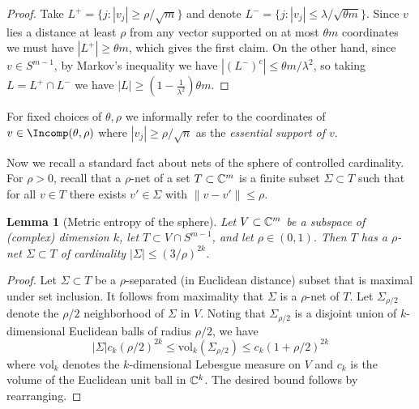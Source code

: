 \documentclass[aop,preprint]{imsart}
\theoremstyle{plain}
\newtheorem{lemma}[theorem]{Lemma}
\theoremstyle{definition}
\theoremstyle{remark}
\numberwithin{equation}{section}
\numberwithin{theorem}{section}
\begin{document}
\begin{proof}
Take $L^+=\{j:|v_j|\ge \rho/\sqrt{m}\}$ and denote $L^-= \{j:|v_j|\le \lambda/\sqrt{\theta m}\}$.
Since $v$ lies a distance at least $\rho$ from any vector supported on at most $\theta m$ coordinates we must have $|L^+|\ge \theta m$, which gives the first claim. 
On the other hand, since $v\in S^{m-1}$, by Markov's inequality we have 
$|(L^-)^c|\le \theta m/\lambda^2$, 
%
so taking $L=L^+\cap L^-$ we have $|L|\ge (1-\frac1{\lambda^2})\theta m$.
\end{proof}

For fixed choices of $\theta,\rho$ we informally refer to the coordinates of $v\in \Incomp(\theta,\rho)$ where $|v_j|\ge \rho/\sqrt{n}$ as the \emph{essential support of $v$}. 

Now we recall a standard fact about nets of the sphere of controlled cardinality.
For $\rho>0$, recall that a $\rho$-net of a set $T\subset {\mathbb C}^m$ is a finite subset $\Sigma\subset T$ such that for all $v\in T$ there exists $v'\in \Sigma$ with $\|v-v'\|\le \rho$.

\begin{lemma}[Metric entropy of the sphere]	\label{lem:net}
Let $V\subset {\mathbb C}^m$ be a subspace of (complex) dimension $k$, let $T\subset V\cap S^{m-1}$, and let $\rho\in(0,1)$.
Then $T$ has a $\rho$-net $\Sigma\subset T$ of cardinality $|\Sigma|\le (3/\rho)^{2k}$.
\end{lemma}

\begin{proof}
Let $\Sigma\subset T$ be a $\rho$-separated (in Euclidean distance) subset that is maximal under set inclusion.
It follows from maximality that $\Sigma$ is a $\rho$-net of $T$.
Let $\Sigma_{\rho/2}$ denote the $\rho/2$ neighborhood of $\Sigma$ in $V$.
Noting that $\Sigma_{\rho/2}$ is a disjoint union of $k$-dimensional Euclidean balls of radius $\rho/2$, we have
$$|\Sigma| c_{k} (\rho/2)^{2k}  \le \text{vol}_k(\Sigma_{\rho/2}) \le c_{k} (1+\rho/2)^{2k}$$
where $\text{vol}_k$ denotes the $k$-dimensional Lebesgue measure on $V$ and $c_{k}$ is the volume of the Euclidean unit ball in ${\mathbb C}^k$. 
The desired bound follows by rearranging.
\end{proof}
\end{document}
